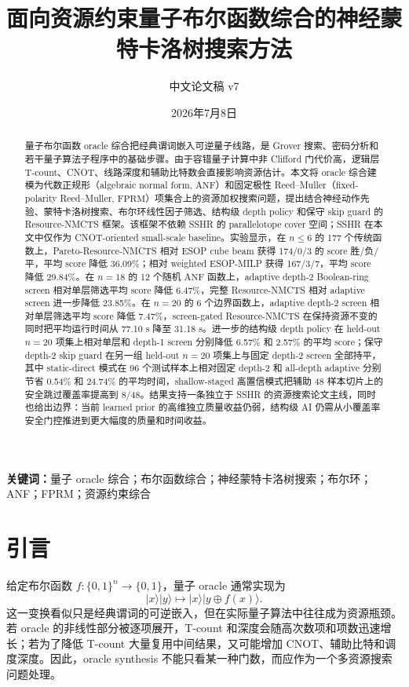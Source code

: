 \documentclass[UTF8,fontset=macnew,11pt]{ctexart}
\title{面向资源约束量子布尔函数综合的神经蒙特卡洛树搜索方法}
\author{中文论文稿 v7}
\date{2026年7月8日}
\newcommand{\method}{Resource-NMCTS}
\newcommand{\pareto}{Pareto-Resource-NMCTS}
\newcommand{\screen}{Boolean-ring screen}
\newcommand{\anf}{\ensuremath{\mathrm{ANF}}}
\newcommand{\fprm}{\ensuremath{\mathrm{FPRM}}}
\newcommand{\xor}{\ensuremath{\oplus}}
\begin{document}
\pagestyle{plain}
\maketitle

\begin{abstract}
量子布尔函数 oracle 综合把经典谓词嵌入可逆量子线路，是 Grover 搜索、密码分析和若干量子算法子程序中的基础步骤。由于容错量子计算中非 Clifford 门代价高，逻辑层 T-count、CNOT、线路深度和辅助比特数会直接影响资源估计。本文将 oracle 综合建模为代数正规形（algebraic normal form, \anf{}）和固定极性 Reed--Muller（fixed-polarity Reed--Muller, \fprm{}）项集合上的资源加权搜索问题，提出结合神经动作先验、蒙特卡洛树搜索、布尔环线性因子筛选、结构级 depth policy 和保守 skip guard 的 \method{} 框架。该框架不依赖 SSHR 的 parallelotope cover 空间；SSHR 在本文中仅作为 CNOT-oriented small-scale baseline。实验显示，在 $n\leq6$ 的 177 个传统函数上，\pareto{} 相对 ESOP cube beam 获得 174/0/3 的 score 胜/负/平，平均 score 降低 36.09\%；相对 weighted ESOP-MILP 获得 167/3/7，平均 score 降低 29.84\%。在 $n=18$ 的 12 个随机 \anf{} 函数上，adaptive depth-2 \screen{} 相对单层筛选平均 score 降低 6.47\%，完整 \method{} 相对 adaptive screen 进一步降低 23.85\%。在 $n=20$ 的 6 个边界函数上，adaptive depth-2 screen 相对单层筛选平均 score 降低 7.47\%，screen-gated \method{} 在保持资源不变的同时把平均运行时间从 77.10 s 降至 31.18 s。进一步的结构级 depth policy 在 held-out $n=20$ 项集上相对单层和 depth-1 screen 分别降低 6.57\% 和 2.57\% 的平均 score；保守 depth-2 skip guard 在另一组 held-out $n=20$ 项集上与固定 depth-2 screen 全部持平，其中 static-direct 模式在 96 个测试样本上相对固定 depth-2 和 all-depth adaptive 分别节省 0.54\% 和 24.74\% 的平均时间，shallow-staged 高置信模式把辅助 48 样本切片上的安全跳过覆盖率提高到 8/48。结果支持一条独立于 SSHR 的资源搜索论文主线，同时也给出边界：当前 learned prior 的高维独立质量收益仍弱，结构级 AI 仍需从小覆盖率安全门控推进到更大幅度的质量和时间收益。
\end{abstract}

\noindent\textbf{关键词：}量子 oracle 综合；布尔函数综合；神经蒙特卡洛树搜索；布尔环；ANF；FPRM；资源约束综合

\section{引言}

给定布尔函数 $f:\{0,1\}^n\rightarrow\{0,1\}$，量子 oracle 通常实现为
\begin{equation}
  |x\rangle |y\rangle \mapsto |x\rangle |y\xor f(x)\rangle .
  \label{eq:oracle}
\end{equation}
这一变换看似只是经典谓词的可逆嵌入，但在实际量子算法中往往成为资源瓶颈。若 oracle 的非线性部分被逐项展开，T-count 和深度会随高次数项和项数迅速增长；若为了降低 T-count 大量复用中间结果，又可能增加 CNOT、辅助比特和调度深度。因此，oracle synthesis 不能只看某一种门数，而应作为一个多资源搜索问题处理。
\end{document}
